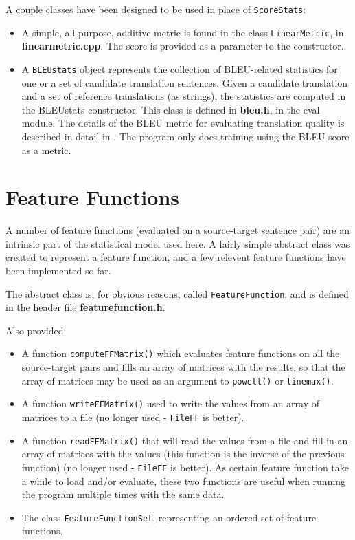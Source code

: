 \documentclass[12pt]{amsart}
\newcommand{\file}{\textbf} \newcommand{\url}{\underline}
\newcommand{\code}[1]{{\small \texttt{#1}}}
\begin{document}
A couple classes have been designed to be used in place of \code{ScoreStats}:
\begin{itemize}
\item A simple, all-purpose, additive metric is found in the class
      \code{LinearMetric}, in \file{linearmetric.cpp}.
  The score is provided as a parameter to the constructor.
\item A \code{BLEUstats} object represents the collection of BLEU-related
      statistics for one or a set of candidate translation sentences.
  Given a candidate translation and a set of reference translations (as
  strings), the statistics are computed in the BLEUstats constructor.  This
  class is defined in \file{bleu.h}, in the eval module.  The details of the
  BLEU metric for evaluating translation quality is described in detail in
  \cite{bleu}.  The program only does training using the BLEU score as a
  metric.
\end{itemize}

\section*{Feature Functions}

A number of feature functions (evaluated on a source-target sentence pair) are
an intrinsic part of the statistical model used here.  A fairly simple abstract
class was created to represent a feature function, and a few relevent feature
functions have been implemented so far.

The abstract class is, for obvious reasons, called \code{FeatureFunction}, and
is defined in the header file \file{featurefunction.h}.

Also provided:
\begin{itemize}
\item A function \code{computeFFMatrix()} which evaluates feature functions on
      all the source-target pairs and fills an array of matrices with the
      results, so that the array of matrices may be used as an argument to
      \code{powell()} or \code{linemax()}.
\item A function \code{writeFFMatrix()} used to write the values from an array
      of matrices to a file (no longer used - \code{FileFF} is better).
\item A function \code{readFFMatrix()} that will read the values from a file
      and fill in an array of matrices with the values (this function is the
      inverse of the previous function) (no longer used - \code{FileFF} is
      better).
  As certain feature function take a while to load and/or evaluate, these two
  functions are useful when running the program multiple times with the same
  data.
\item The class \code{FeatureFunctionSet}, representing an ordered set of
      feature functions.
\end{itemize}
\end{document}
